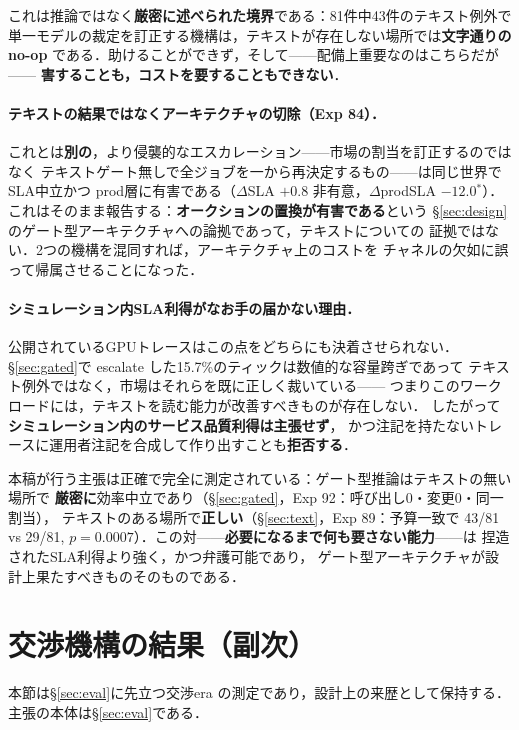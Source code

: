 \documentclass[uplatex,twocolumn,fontsize=9pt,paper=a4]{jlreq}
\newcommand{\sig}{$^{*}$}
\begin{document}
これは推論ではなく\textbf{厳密に述べられた境界}である：81件中43件のテキスト例外で
単一モデルの裁定を訂正する機構は，テキストが存在しない場所では\textbf{文字通りの
no-op} である．助けることができず，そして——配備上重要なのはこちらだが——
\textbf{害することも，コストを要することもできない}．

\paragraph{テキストの結果ではなくアーキテクチャの切除（Exp 84）．}
これとは\textbf{別の}，より侵襲的なエスカレーション——市場の割当を訂正するのではなく
テキストゲート無しで全ジョブを一から再決定するもの——は同じ世界で SLA中立かつ
prod層に有害である（$\Delta$SLA $+0.8$ 非有意，$\Delta$prodSLA $-12.0$\sig）．
これはそのまま報告する：\textbf{オークションの置換が有害である}という
\S\ref{sec:design}のゲート型アーキテクチャへの論拠であって，テキストについての
証拠ではない．2つの機構を混同すれば，アーキテクチャ上のコストを
チャネルの欠如に誤って帰属させることになった．

\paragraph{シミュレーション内SLA利得がなお手の届かない理由．}
公開されているGPUトレースはこの点をどちらにも決着させられない．
\S\ref{sec:gated}で escalate した15.7\%のティックは数値的な容量跨ぎであって
テキスト例外ではなく，市場はそれらを既に正しく裁いている——
つまりこのワークロードには，テキストを読む能力が改善すべきものが存在しない．
したがって\textbf{シミュレーション内のサービス品質利得は主張せず}，
かつ注記を持たないトレースに運用者注記を合成して作り出すことも\textbf{拒否する}．

本稿が行う主張は正確で完全に測定されている：ゲート型推論はテキストの無い場所で
\textbf{厳密に}効率中立であり（\S\ref{sec:gated}，Exp 92：呼び出し0・変更0・同一割当），
テキストのある場所で\textbf{正しい}（\S\ref{sec:text}，Exp 89：予算一致で 43/81 vs 29/81,
$p=0.0007$）．この対——\textbf{必要になるまで何も要さない能力}——は
捏造されたSLA利得より強く，かつ弁護可能であり，
ゲート型アーキテクチャが設計上果たすべきものそのものである．

\section{交渉機構の結果（副次）}\label{sec:nego}
本節は\S\ref{sec:eval}に先立つ交渉era の測定であり，設計上の来歴として保持する．
主張の本体は\S\ref{sec:eval}である．
\end{document}
